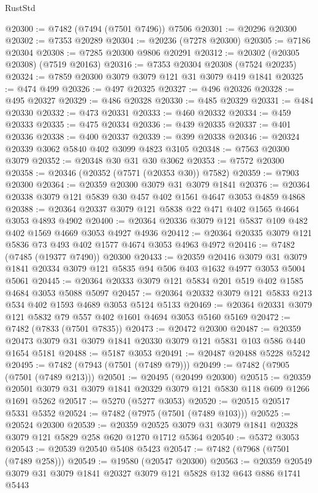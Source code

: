 \begin{lexlean}{RustStd}
\begin{coremodule}
{\begin{coremodule}
{{{{{{{{{{{{{{{{{{{{{{{{{{{{{{{{@20300 := @7482 (@7494 (@7501 @7496)) @7506
@20301 := @20296 @20300
@20302 := @7353 @20289
@20304 := @20236 (@7278 @20300)
@20305 := @7186 @20304
@20308 := @7285 @20300 @9806 @20291
@20312 := @20302 (@20305 @20308) (@7519 @20163)
@20316 := @7353 @20304 @20308 (@7524 @20235)
@20324 := @7859 @20300 @3079 @3079 @121 @31 @3079 @419 @1841
@20325 := @474 @499
@20326 := @497 @20325
@20327 := @496 @20326
@20328 := @495 @20327
@20329 := @486 @20328
@20330 := @485 @20329
@20331 := @484 @20330
@20332 := @473 @20331
@20333 := @460 @20332
@20334 := @459 @20333
@20335 := @475 @20334
@20336 := @439 @20335
@20337 := @401 @20336
@20338 := @400 @20337
@20339 := @399 @20338
@20346 := @20324 @20339 @3062 @5840 @402 @3099 @4823 @3105
@20348 := @7563 @20300 @3079
@20352 := @20348 @30 @31 @30 @3062
@20353 := @7572 @20300
@20358 := @20346 (@20352 (@7571 (@20353 @30)) @7582)
@20359 := @7903 @20300
@20364 := @20359 @20300 @3079 @31 @3079 @1841
@20376 := @20364 @20338 @3079 @121 @5839 @30 @457 @402 @1561 @4647 @3053 @4859 @4868
@20388 := @20364 @20337 @3079 @121 @5838 @22 @471 @402 @1565 @4664 @3053 @4893 @4902
@20400 := @20364 @20336 @3079 @121 @5837 @109 @482 @402 @1569 @4669 @3053 @4927 @4936
@20412 := @20364 @20335 @3079 @121 @5836 @73 @493 @402 @1577 @4674 @3053 @4963 @4972
@20416 := @7482 (@7485 (@19377 @7490)) @20300
@20433 := @20359
    @20416
    @3079
    @31
    @3079
    @1841
    @20334
    @3079
    @121
    @5835
    @94
    @506
    @403
    @1632
    @4977
    @3053
    @5004
    @5061
@20445 := @20364 @20333 @3079 @121 @5834 @201 @519 @402 @1585 @4684 @3053 @5088 @5097
@20457 := @20364 @20332 @3079 @121 @5833 @213 @534 @402 @1593 @4689 @3053 @5124 @5133
@20469 := @20364 @20331 @3079 @121 @5832 @79 @557 @402 @1601 @4694 @3053 @5160 @5169
@20472 := @7482 (@7833 (@7501 @7835))
@20473 := @20472 @20300
@20487 := @20359 @20473 @3079 @31 @3079 @1841 @20330 @3079 @121 @5831 @103 @586 @440 @1654 @5181
@20488 := @5187 @3053
@20491 := @20487 @20488 @5228 @5242
@20495 := @7482 (@7943 (@7501 (@7489 @79)))
@20499 := @7482 (@7905 (@7501 (@7489 @213)))
@20501 := @20495 (@20499 @20300)
@20515 := @20359 @20501 @3079 @31 @3079 @1841 @20329 @3079 @121 @5830 @118 @609 @1266 @1691 @5262
@20517 := @5270 (@5277 @3053)
@20520 := @20515 @20517 @5331 @5352
@20524 := @7482 (@7975 (@7501 (@7489 @103)))
@20525 := @20524 @20300
@20539 := @20359 @20525 @3079 @31 @3079 @1841 @20328 @3079 @121 @5829 @258 @620 @1270 @1712 @5364
@20540 := @5372 @3053
@20543 := @20539 @20540 @5408 @5423
@20547 := @7482 (@7968 (@7501 (@7489 @258)))
@20549 := @19580 (@20547 @20300)
@20563 := @20359 @20549 @3079 @31 @3079 @1841 @20327 @3079 @121 @5828 @132 @643 @886 @1741 @5443
}}}}}}}}}}}}}}}}}}}}}}}}}}}}}}}}
\end{coremodule}}
\end{coremodule}
\end{lexlean}
